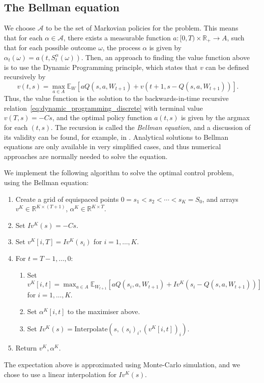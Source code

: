 \documentclass[main.tex]{subfiles}
\begin{document}
\subsection{The Bellman equation}
We choose $\mathcal A$ to be the set of Markovian policies for the
problem. This means that for each $\alpha\in \mathcal
A$, there exists a
measurable function $a:[0,T)\times \mathbb R_+\to A$, such that for each possible outcome
$\omega$, the process $\alpha$ is given by
$\alpha_t(\omega) =
a(t,S_t^\alpha(\omega))$.
Then,
an approach to finding the value function above is to use the Dynamic
Programming principle, which states that $v$ can be defined
recursively by
\begin{equation}\label{eq:dynamic_programming_discrete}
  v(t,s)=\max_{a\in A}\mathbb E_{W}\left[
          aQ(s,a,W_{t+1})
          +v(t+1,s-Q(s,a,W_{t+1}))\right].
\end{equation}
Thus, the value function is the solution to the backwards-in-time
recursive relation~\eqref{eq:dynamic_programming_discrete} with
terminal value $v(T,s)=-Cs$, and the optimal policy
function $a(t,s)$ is given by the argmax for each $(t,s)$.
The recursion is called the \emph{Bellman equation}, and a discussion
of its validity can be found, for example, in
\citet{bertsekas2005dynamic}.
Analytical solutions to Bellman equations are only available in very
simplified cases, and thus numerical approaches are normally needed to
solve the equation.

We implement the following algorithm to solve the optimal control
problem, using the Bellman equation:
\begin{enumerate}
\item Create a grid of equispaced points $0=s_1<s_2<\cdots<s_K=S_0$, and arrays $v^K\in\mathbb R^{K\times(T+1)}$,
  $\alpha^K\in\mathbb R^{K\times T}$.
\item Set $Iv^K(s)=-Cs$.
\item Set $v^K[i,T]=Iv^K(s_i)$ for $i=1,\dots, K$.
\item For $t = T-1,\dots,0$:
  \begin{enumerate}
  \item Set $\displaystyle v^K[i,t]=\max_{a\in A}\mathbb E_{W_{t+1}}\left[ aQ(s_i,a,W_{t+1})
      +Iv^K(s_i-Q(s,a,W_{t+1}))\right]$\\ for $i=1,\dots,K$.
  \item Set $\alpha^K[i,t]$ to the maximiser above.
  \item Set $Iv^K(s) = \mathrm{Interpolate}(s, {(s_i)}_i,{(v^K[i,t])}_i)$.
  \end{enumerate}
\item Return $v^K,\alpha^K$.
\end{enumerate}
The expectation above is approximated using Monte-Carlo simulation, and
we chose to use a linear interpolation for $Iv^K(s)$.
\end{document}
